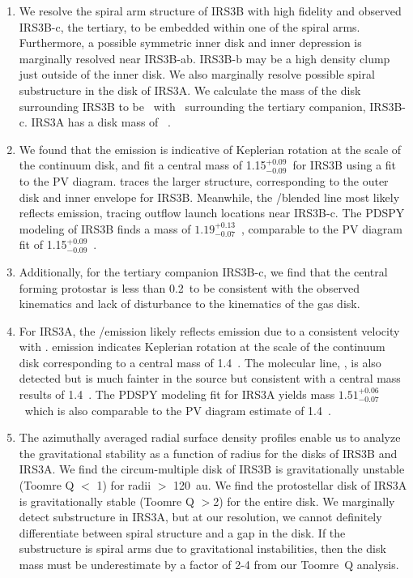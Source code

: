 \documentclass[twocolumn, 12pt, trackchanges]{aastex63}
\begin{document}
\begin{enumerate}
    \item We resolve the spiral arm structure of IRS3B with high fidelity and observed IRS3B-c, the tertiary, to be embedded within one of the spiral arms. Furthermore, a possible symmetric inner disk and inner depression is marginally resolved near IRS3B-ab. IRS3B-b may be a high density clump just outside of the inner disk. We also marginally resolve possible spiral substructure in the disk of IRS3A. We calculate the mass of the disk surrounding IRS3B to be ~\solm\space with ~\solm\space surrounding the tertiary companion, IRS3B-c. IRS3A has a disk mass of ~\solm. 
    \item We found that the \cso\space emission is indicative of Keplerian rotation at the scale of the continuum disk, and fit a central mass of 1.15$^{+0.09}_{-0.09}$~\solm\space for IRS3B using a fit to the PV diagram. \htcop\space traces the larger structure, corresponding to the outer disk and inner envelope for IRS3B. Meanwhile, the \htcn/\sot\space blended line most likely reflects \sot\space emission, tracing outflow launch locations near IRS3B-c. The PDSPY modeling of IRS3B finds a mass of $1.19^{+0.13}_{-0.07}$~\solm, comparable to the PV diagram fit of 1.15$^{+0.09}_{-0.09}$~\solm.
    \item Additionally, for the tertiary companion IRS3B-c, we find that the central forming protostar is  less than 0.2~\solm\space to be consistent with the observed kinematics and lack of disturbance to the kinematics of the gas disk.
    \item For IRS3A, the \htcn/\sot\space emission likely reflects \htcn\space emission due to a consistent velocity with \cso. \htcn\space emission indicates Keplerian rotation at the scale of the continuum disk corresponding to a central mass of 1.4~\solm. The molecular line, \cso, is also detected but is much fainter in the source but consistent with a central mass results of 1.4~\solm. The PDSPY modeling fit for IRS3A yields mass $1.51^{+0.06}_{-0.07}$~\solm\space which is also comparable to the PV diagram estimate of 1.4~\solm.
    \item The azimuthally averaged radial surface density profiles enable us to analyze the gravitational stability as a function of radius for the disks of IRS3B and IRS3A. We find the circum-multiple disk of IRS3B is gravitationally unstable (Toomre Q $<$ 1) for radii $>$ 120~au. We find the protostellar disk of IRS3A is gravitationally stable (Toomre Q $>$2) for the entire disk. We marginally detect substructure in IRS3A, but at our resolution, we cannot definitely differentiate between spiral structure and a gap in the disk. If the substructure is spiral arms due to gravitational instabilities, then the disk mass must be underestimate by a factor of 2-4 from our Toomre~Q analysis.
\end{enumerate}
\end{document}
